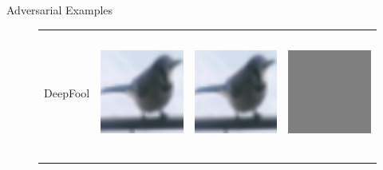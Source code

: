 \documentclass[final]{beamer}
\newlength{\onecolwid}
\newlength{\twocolwid}
\begin{document}
\begin{frame}[t]
\begin{columns}[t]
\begin{column}{\twocolwid}
\begin{columns}[t,totalwidth=\twocolwid]
\begin{column}{\onecolwid}
\begin{block}{Adversarial Examples}
\begin{figure}[h]
\begin{tabular}{rlll}
			DeepFool & \includegraphics[height=4cm, align=c]{../figures/deepfool_orig.pdf} & \includegraphics[height=4cm, align=c]{../figures/deepfool_adversarial.pdf} & \includegraphics[height=4cm, align=c]{../figures/deepfool_diff.pdf}\\
			\\

\end{tabular}
\end{figure}
\end{block}
\end{column}
\end{columns}
\end{column}
\end{columns}
\end{frame}
\end{document}
